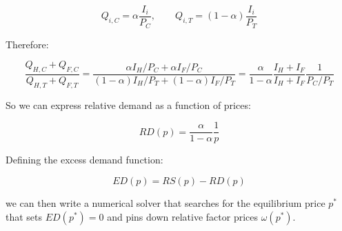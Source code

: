 \documentclass[11pt,letterpaper]{article}
\begin{document}
\begin{equation*}
    Q_{i,C} = \alpha  \frac{I_i}{P_{C}}, \qquad Q_{i,T} = (1-\alpha) \frac{I_i}{P_{T}}
\end{equation*}

Therefore:

\begin{equation*}
    \frac{Q_{H,C} + Q_{F,C} }{Q_{H,T}  + Q_{F,T} } = \frac{\alpha I_H/P_C + \alpha I_F/P_C}{(1-\alpha) I_H/P_T + (1-\alpha) I_F/P_T} = \frac{\alpha}{1-\alpha} \frac{I_H + I_F}{I_H + I_F} \frac{1}{P_C/P_T}
\end{equation*}

So we can express relative demand as a function of prices:

\begin{equation*}
    RD(p) = \frac{\alpha}{1-\alpha} \frac{1}{p}
\end{equation*}

Defining the excess demand function:

\begin{equation*}
    ED(p) =  RS(p) - RD(p)
\end{equation*}

we can then write a numerical solver that searches for the equilibrium price $p^*$ that sets $ED(p^*)=0$ and pins down relative factor prices $\omega(p^*)$. 
\end{document}
